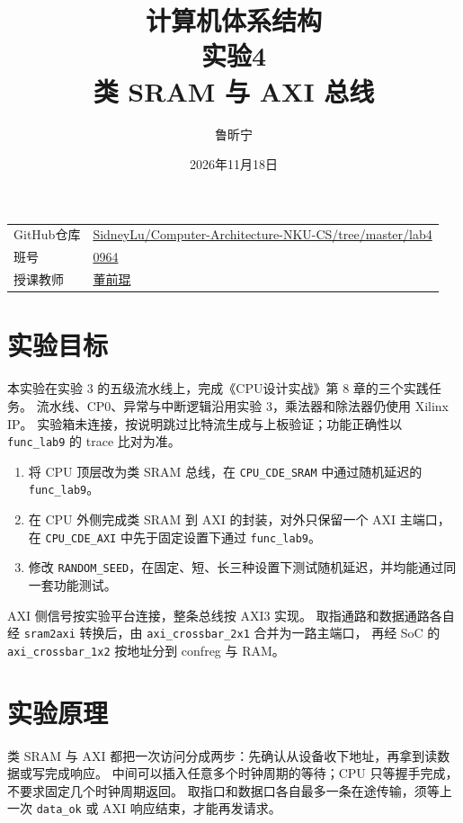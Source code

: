 \documentclass{article}
\title{计算机体系结构\\实验4\\类 SRAM 与 AXI 总线}
\author{鲁昕宁 \quad 2414015}
\date{2026年11月18日}
\begin{document}
\maketitle
\begin{center}
\begin{tabular}{ll}
GitHub仓库 & \parbox[t]{0.72\textwidth}{\raggedright\url{SidneyLu/Computer-Architecture-NKU-CS/tree/master/lab4}} \\[0.6em]
班号 & \underline{0964} \\[0.6em]
授课教师 & \underline{董前琨} \\[0.6em]
\end{tabular}
\end{center}

\newpage

\section{实验目标}
本实验在实验 3 的五级流水线上，完成《CPU设计实战》第 8 章的三个实践任务。
流水线、CP0、异常与中断逻辑沿用实验 3，乘法器和除法器仍使用 Xilinx IP。
实验箱未连接，按说明跳过比特流生成与上板验证；功能正确性以 \texttt{func\_lab9} 的 trace 比对为准。

\begin{enumerate}
  \item 将 CPU 顶层改为类 SRAM 总线，在 \texttt{CPU\_CDE\_SRAM} 中通过随机延迟的 \texttt{func\_lab9}。
  \item 在 CPU 外侧完成类 SRAM 到 AXI 的封装，对外只保留一个 AXI 主端口，
        在 \texttt{CPU\_CDE\_AXI} 中先于固定设置下通过 \texttt{func\_lab9}。
  \item 修改 \texttt{RANDOM\_SEED}，在固定、短、长三种设置下测试随机延迟，并均能通过同一套功能测试。
\end{enumerate}

AXI 侧信号按实验平台连接，整条总线按 AXI3 实现。
取指通路和数据通路各自经 \texttt{sram2axi} 转换后，由 \texttt{axi\_crossbar\_2x1} 合并为一路主端口，
再经 SoC 的 \texttt{axi\_crossbar\_1x2} 按地址分到 confreg 与 RAM。

\section{实验原理}
类 SRAM 与 AXI 都把一次访问分成两步：先确认从设备收下地址，再拿到读数据或写完成响应。
中间可以插入任意多个时钟周期的等待；CPU 只等握手完成，不要求固定几个时钟周期返回。
取指口和数据口各自最多一条在途传输，须等上一次 \texttt{data\_ok} 或 AXI 响应结束，才能再发请求。
\end{document}
